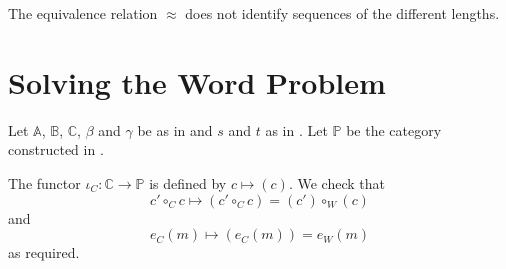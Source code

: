 \documentclass{article}
\begin{document}
\begin{remark}
	The equivalence relation $\approx$ does not identify sequences of the different lengths.
\end{remark}

\section{Solving the Word Problem} %
\label{sub:solving_the_word_problem}

\begin{notation}
	Let $\mathbb{A}$, $\mathbb{B}$, $\mathbb{C}$, $\beta$ and $\gamma$ be as in  and $s$ and $t$ as in .
	Let $\mathbb{P}$ be the category constructed in .
\end{notation}

\begin{definition}
	The functor $\iota_C:\mathbb{C}\rightarrow \mathbb{P}$ is defined by $c\mapsto (c)$.
	We check that
	\begin{equation*}
		c'\circ_C c\mapsto (c'\circ_C c)=(c')\circ_W (c)
	\end{equation*}
	and
	\begin{equation*}
		e_C(m)\mapsto (e_C(m))=e_W(m)
	\end{equation*}
	as required.
\end{definition}
\end{document}
